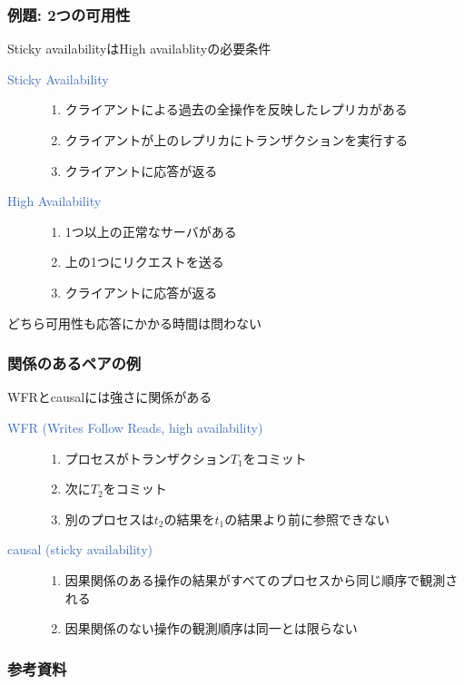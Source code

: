 \documentclass[unicode, 14pt, aspectratio=169]{beamer}
\begin{document}
\begin{frame}
  \frametitle{例題: 2つの可用性}
  {\large Sticky availabilityはHigh availablityの必要条件}
  \begin{description}
  \item[\textcolor{highlight}{Sticky Availability}]
    \begin{enumerate}[before=\leavevmode]
    \item クライアントによる過去の全操作を反映したレプリカがある
    \item クライアントが上のレプリカにトランザクションを実行する
    \item クライアントに応答が返る
    \end{enumerate}
  \item[\textcolor{highlight}{High Availability}]
    \begin{enumerate}[before=\leavevmode]
    \item 1つ以上の正常なサーバがある
    \item 上の1つにリクエストを送る
    \item クライアントに応答が返る
    \end{enumerate}
  \end{description}
  どちら可用性も応答にかかる時間は問わない
\end{frame}
\begin{frame}
  \frametitle{関係のあるペアの例}
  {\large WFRとcausalには強さに関係がある}
  \begin{description}
  \item[\textcolor{highlight}{WFR (Writes Follow Reads, high availability)}]
    \begin{enumerate}[before=\leavevmode]
    \item プロセスがトランザクション$T_1$をコミット
     \item 次に$T_2$をコミット
    \item 別のプロセスは$t_2$の結果を$t_1$の結果より前に参照できない
    \end{enumerate}
  \item[\textcolor{highlight}{causal (sticky availability)}]
    \begin{enumerate}[before=\leavevmode]
    \item 因果関係のある操作の結果がすべてのプロセスから同じ順序で観測される
    \item 因果関係のない操作の観測順序は同一とは限らない
      \end{enumerate}
  \end{description}
\end{frame}
\begin{frame}[allowframebreaks,t]
  \frametitle{参考資料}
  \printbibliography
  \nocite{*}
\end{frame}
\end{document}
